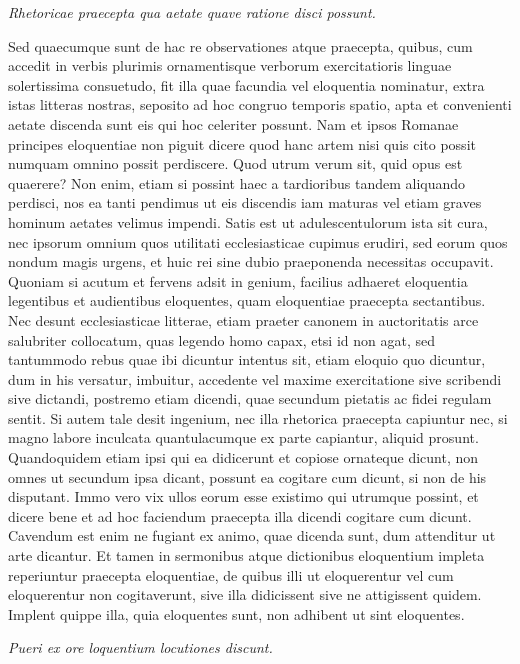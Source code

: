 \textit{Rhetoricae praecepta qua aetate quave ratione disci possunt.}

Sed quaecumque sunt de hac re observationes atque praecepta, quibus, cum accedit in verbis plurimis ornamentisque verborum exercitatioris linguae solertissima consuetudo, fit illa quae facundia vel eloquentia nominatur, extra istas litteras nostras, seposito ad hoc congruo temporis spatio, apta et convenienti aetate discenda sunt eis qui hoc celeriter possunt. Nam et ipsos Romanae principes eloquentiae non piguit dicere quod hanc artem nisi quis cito possit numquam omnino possit perdiscere. Quod utrum verum sit, quid opus est quaerere? Non enim, etiam si possint haec a tardioribus tandem aliquando perdisci, nos ea tanti pendimus ut eis discendis iam maturas vel etiam graves hominum aetates velimus impendi. Satis est ut adulescentulorum ista sit cura, nec ipsorum omnium quos utilitati ecclesiasticae cupimus erudiri, sed eorum quos nondum magis urgens, et huic rei sine dubio praeponenda necessitas occupavit. Quoniam si acutum et fervens adsit in genium, facilius adhaeret eloquentia legentibus et audientibus eloquentes, quam eloquentiae praecepta sectantibus. Nec desunt ecclesiasticae litterae, etiam praeter canonem in auctoritatis arce salubriter collocatum, quas legendo homo capax, etsi id non agat, sed tantummodo rebus quae ibi dicuntur intentus sit, etiam eloquio quo dicuntur, dum in his versatur, imbuitur, accedente vel maxime exercitatione sive scribendi sive dictandi, postremo etiam dicendi, quae secundum pietatis ac fidei regulam sentit. Si autem tale desit ingenium, nec illa rhetorica praecepta capiuntur nec, si magno labore inculcata quantulacumque ex parte capiantur, aliquid prosunt. Quandoquidem etiam ipsi qui ea didicerunt et copiose ornateque dicunt, non omnes ut secundum ipsa dicant, possunt ea cogitare cum dicunt, si non de his disputant. Immo vero vix ullos eorum esse existimo qui utrumque possint, et dicere bene et ad hoc faciendum praecepta illa dicendi cogitare cum dicunt. Cavendum est enim ne fugiant ex animo, quae dicenda sunt, dum attenditur ut arte dicantur. Et tamen in sermonibus atque dictionibus eloquentium impleta reperiuntur praecepta eloquentiae, de quibus illi ut eloquerentur vel cum eloquerentur non cogitaverunt, sive illa didicissent sive ne attigissent quidem. Implent quippe illa, quia eloquentes sunt, non adhibent ut sint eloquentes.

\textit{Pueri ex ore loquentium locutiones discunt.}

